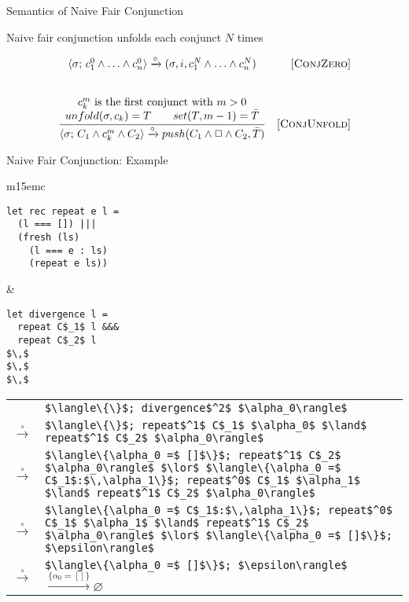 \documentclass[14pt,aspectratio=169]{beamer}
\let\\\tabularnewline
\let\\\tabularnewline
\newcommand{\set}[1]{\{#1\}}
\newcommand{\ruleno}[1]{\mbox{[\textsc{#1}]}}
\newcommand{\inbr}[1]{\langle #1 \rangle}
\renewcommand{\emptyset}{\varnothing}
\theoremstyle{definition}
\begin{document}
\begin{frame}[fragile]{Semantics of Naive Fair Conjunction}

\begin{center}
    Naive fair conjunction unfolds each conjunct $N$ times
\end{center}

\[\begin{array}{cr}
      {\inbr{\sigma;\, c_1^0 \land \ldots \land c_n^0} \xrightarrow{\circ} (\sigma, i, c_1^N \land \ldots \land c_n^N)}
&     \ruleno{ConjZero} \\[8mm]
\dfrac{\begin{array}{c}
      c_k^m \mbox{ is the first conjunct with } m > 0 \\ 
      unfold(\sigma, c_k) = T \qquad set(T, m - 1) = \bar{T}
      \end{array}}
      {
      \inbr{\sigma;\, C_1 \land c_k^m \land C_2} \xrightarrow{\circ} push(C_1 \land \Box \land C_2, \bar{T})
      }
&     \ruleno{ConjUnfold}
\end{array}\]
\end{frame}

\begin{frame}[fragile]{Naive Fair Conjunction: Example}
\begin{center}
\begin{tabular}{m{15em}c}
\begin{lstlisting}
let rec repeat e l =
  (l === []) |||
  (fresh (ls)
    (l === e : ls)
    (repeat e ls))
\end{lstlisting} &
\begin{lstlisting}
let divergence l = 
  repeat C$_1$ l &&& 
  repeat C$_2$ l
$\,$
$\,$
$\,$
\end{lstlisting}
\end{tabular}

\begin{tabular}{rl}
                      & 
\lstinline|$\langle\set{}$; divergence$^2$ $\alpha_0\rangle$| \\ \pause
$\xrightarrow{\circ}\!\!\!\!$ &
\lstinline|$\langle\set{}$; repeat$^1$ C$_1$ $\alpha_0$ $\land$ repeat$^1$ C$_2$ $\alpha_0\rangle$| \\ \pause
$\xrightarrow{\circ}\!\!\!\!$ &
\lstinline|$\langle\{\alpha_0 =$ []$\}$; repeat$^1$ C$_2$ $\alpha_0\rangle$ $\lor$ $\langle\{\alpha_0 =$ C$_1$:$\,\alpha_1\}$; repeat$^0$ C$_1$ $\alpha_1$ $\land$ repeat$^1$ C$_2$ $\alpha_0\rangle$| \\ \pause
$\xrightarrow{\circ}\!\!\!\!$ &
\lstinline|$\langle\{\alpha_0 =$ C$_1$:$\,\alpha_1\}$; repeat$^0$ C$_1$ $\alpha_1$ $\land$ repeat$^1$ C$_2$ $\alpha_0\rangle$ $\lor$ $\langle\{\alpha_0 =$ []$\}$; $\epsilon\rangle$| \\ \pause
$\xrightarrow{\circ}\!\!\!\!$ &
\lstinline|$\langle\{\alpha_0 =$ []$\}$; $\epsilon\rangle$| $\xrightarrow{\{\alpha_0 = []\}} \emptyset$ \\
\end{tabular}
\end{center}
\end{frame}
\end{document}
